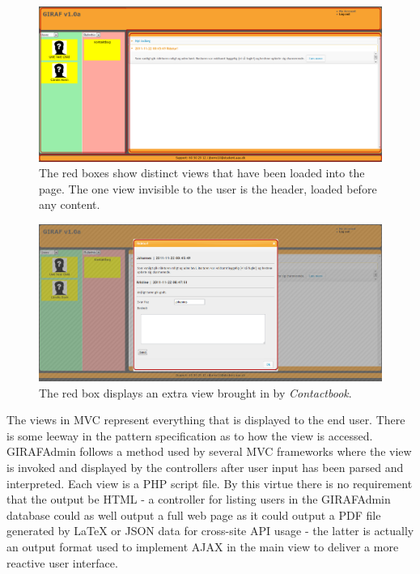 \begin{figure}
    \begin{center}
    \includegraphics[scale=0.45,angle=90]{img/mvc_details/mvc_detailed_views}
    \caption{\label{implementation_view_views1}The red boxes show distinct views that have been loaded into the page. The one view invisible to the user is the header, loaded before any content.}
    \end{center}
\end{figure}

\begin{figure}
    \begin{center}
    \includegraphics[scale=0.45,angle=90]{img/mvc_details/mvc_detailed_views2_view}
    \caption{\label{implementation_view_views1}The red box displays an extra view brought in by \emph{Contactbook}.}
    \end{center}
\end{figure}

The views in MVC represent everything that is displayed to the end user. There is some leeway in the pattern specification as to how the view is accessed. GIRAFAdmin follows a method used by several MVC frameworks where the view is invoked and displayed by the controllers after user input has been parsed and interpreted. Each view is a PHP script file. By this virtue there is no requirement that the output be HTML - a controller for listing users in the GIRAFAdmin database could as well output a full web page as it could output a PDF file generated by LaTeX or JSON data for cross-site API usage - the latter is actually an output format used to implement AJAX in the main view to deliver a more reactive user interface.

